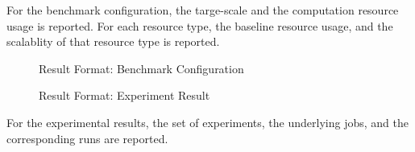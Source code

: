 For the benchmark configuration, the targe-scale and the computation resource usage is reported. For each resource type, the baseline resource usage, and the scalablity of that resource type is reported.

\begin{figure}[!h]
	\centering
	\caption{Result Format: Benchmark Configuration}
	\label{fig:result-format:conf}
\end{figure}

\begin{figure}[!h]
	\centering
	\caption{Result Format: Experiment Result}
	\label{fig:result-format:result}
\end{figure}

For the experimental results, the set of experiments, the underlying jobs, and the corresponding runs are reported.
